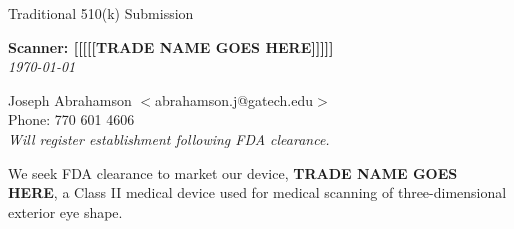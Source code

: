 \newpage
\singlespacing

\begin{flushright}
  \huge{Traditional 510(k) Submission}\\[.5in]
  
  \begin{minipage}{0.8\textwidth}
    \begin{flushright}
      \large \textbf{Scanner: [[[[[TRADE NAME GOES HERE]]]]]} \\
      \textit{\today}
    \end{flushright}
  \end{minipage}
\end{flushright}

\begin{flushleft}
  Joseph Abrahamson $<$abrahamson.j@gatech.edu$>$ \\
  Phone: 770 601 4606 \\[1em]
  
  \textit{Will register establishment following FDA clearance.}
\end{flushleft}

We seek FDA clearance to market our device, \textbf{TRADE NAME GOES
  HERE}, a Class II medical device used for medical scanning of
three-dimensional exterior eye shape.

